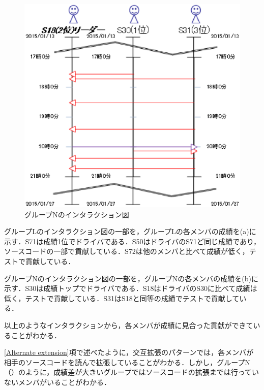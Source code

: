 \begin{figure}[tb]
	\begin{center}
		\includegraphics[scale=0.4]{img/flowN.eps}
		\caption{グループNのインタラクション図}
		\label{fig:flowN}
	\end{center}
\end{figure}


グループLのインタラクション図の一部を，グループLの各メンバの成績を(a)に示す．S71は成績1位でドライバである．S50はドライバのS71ど同じ成績であり，ソースコードの一部で貢献している．S72は他のメンバと比べて成績が低く，テストで貢献している．

グループNのインタラクション図の一部を，グループNの各メンバの成績を(b)に示す．S30は成績トップでドライバである．S18はドライバのS30に比べて成績は低く，テストで貢献している．S31はS18と同等の成績でテストで貢献している．

以上のようなインタラクションから，各メンバが成績に見合った貢献ができていることがわかる．

\ref{Alternate extension}項で述べたように，交互拡張のパターンでは，各メンバが相手のソースコードを読んで拡張していることがわかる．しかし，グループN（）のように，成績差が大きいグループではソースコードの拡張までは行っていないメンバがいることがわかる．